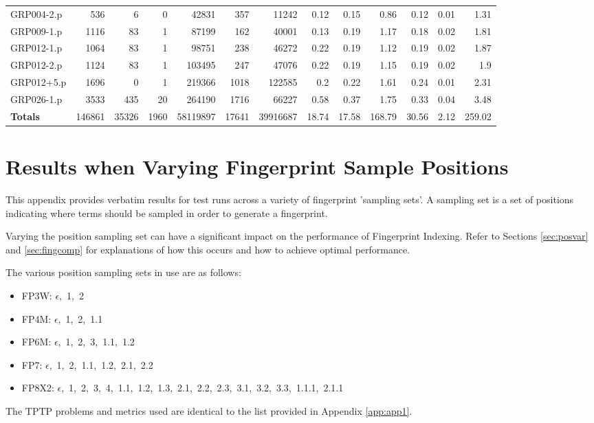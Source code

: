 \begin{table}[H]
\begin{adjustwidth}{-0.4in}{-0.5in}
\begin{tabular}{| l || r | r | r || r | r | r || r | r | r | r | r | r |}
GRP004-2.p&536&6&0&42831&357&11242&0.12&0.15&0.86&0.12&0.01&1.31\\
GRP009-1.p&1116&83&1&87199&162&40001&0.13&0.19&1.17&0.18&0.02&1.81\\
GRP012-1.p&1064&83&1&98751&238&46272&0.22&0.19&1.12&0.19&0.02&1.87\\
GRP012-2.p&1124&83&1&103495&247&47076&0.22&0.19&1.15&0.19&0.02&1.9\\
GRP012+5.p&1696&0&1&219366&1018&122585&0.2&0.22&1.61&0.24&0.01&2.31\\
GRP026-1.p&3533&435&20&264190&1716&66227&0.58&0.37&1.75&0.33&0.04&3.48\\ \hline \hline
\textbf{Totals}&146861&35326&1960&58119897&17641&39916687&18.74&17.58&168.79&30.56&2.12&259.02\\\hline
\end{tabular}\end{adjustwidth}\end{table}


\chapter{Results when Varying Fingerprint Sample Positions}
\label{app:app2}

This appendix provides verbatim results for test runs across a variety of fingerprint
'sampling sets'. A sampling set is a set of positions indicating where terms should
be sampled in order to generate a fingerprint.

Varying the position sampling set can have a significant impact on the performance of Fingerprint
Indexing. Refer to Sections \ref{sec:posvar} and \ref{sec:fingcomp} for explanations
of how this occurs and how to achieve optimal performance.

The various position sampling sets in use are as follows:
\begin{itemize}
  \item FP3W:  $\epsilon$,\ 1,\ 2
  \item FP4M:  $\epsilon$,\ 1,\ 2,\ 1.1
  \item FP6M:  $\epsilon$,\ 1,\ 2,\ 3,\ 1.1,\ 1.2
  \item FP7:   $\epsilon$,\ 1,\ 2,\ 1.1,\ 1.2,\ 2.1,\ 2.2
  \item FP8X2: $\epsilon$,\ 1,\ 2,\ 3,\ 4,\ 1.1,\ 1.2,\ 1.3,\ 2.1,\ 2.2,\ 2.3,\ 3.1,\ 3.2,\ 3.3,\ 1.1.1,\ 2.1.1
\end{itemize}

The TPTP problems and metrics used are identical to the list provided in Appendix
\ref{app:app1}.

